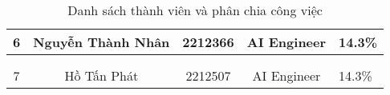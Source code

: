\begin{table}[H]
\begin{tabular}{|c|c|c|c|p{4cm}|}
\multirow{-3}{*}{6} & \multirow{-3}{*}{Nguyễn Thành Nhân}       & \multirow{-3}{*}{2212366}         & \multirow{-3}{3cm}{\centering AI Engineer}                & \multirow{-3}{3cm}{14.3\%}                                        \\ \hline
                    &                                           &                                   &                                                           &                                                                   \\ \cline{5-5} 
                    &                                           &                                   &                                                           &                                                                   \\ \cline{5-5}  
\multirow{-3}{*}{7} & \multirow{-3}{*}{Hồ Tấn Phát}             & \multirow{-3}{*}{2212507}         & \multirow{-3}{3cm}{\centering AI Engineer}                & \multirow{-3}{3cm}{14.3\%}                                        \\ \hline
\end{tabular}
\caption{Danh sách thành viên và phân chia công việc}
\end{table}

\newpage